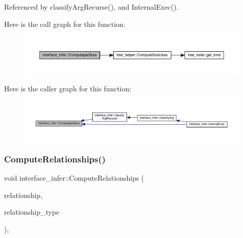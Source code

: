 Referenced by classify\+Arg\+Recurse(), and Internal\+Exec().

Here is the call graph for this function\+:
\nopagebreak
\begin{figure}[H]
\begin{center}
\leavevmode
\includegraphics[width=350pt]{d9/d8a/classinterface__infer_a5da918cda06334bf2d7b6828c90ede34_cgraph}
\end{center}
\end{figure}
Here is the caller graph for this function\+:
\nopagebreak
\begin{figure}[H]
\begin{center}
\leavevmode
\includegraphics[width=350pt]{d9/d8a/classinterface__infer_a5da918cda06334bf2d7b6828c90ede34_icgraph}
\end{center}
\end{figure}
\mbox{\label{classinterface__infer_adaf46bd679e004e36be194484e47e54e}} 
\subsubsection{\texorpdfstring{Compute\+Relationships()}{ComputeRelationships()}}
{\footnotesize\ttfamily void interface\+\_\+infer\+::\+Compute\+Relationships (\begin{DoxyParamCaption}\item[{\hyperlink{classDesignFlowStepSet}{Design\+Flow\+Step\+Set} \&}]{relationship,  }\item[{const \hyperlink{classDesignFlowStep_a723a3baf19ff2ceb77bc13e099d0b1b7}{Design\+Flow\+Step\+::\+Relationship\+Type}}]{relationship\+\_\+type }\end{DoxyParamCaption})\hspace{0.3cm}{\ttfamily [override]}, {\ttfamily [virtual]}}




